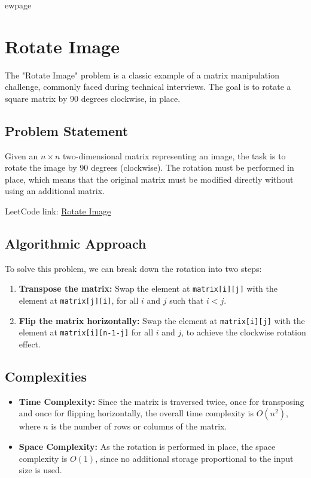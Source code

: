 
ewpage

\chapter{Rotate Image}
\label{chap:Rotate_Image}
The "Rotate Image" problem is a classic example of a matrix manipulation challenge, commonly faced during technical interviews. The goal is to rotate a square matrix by 90 degrees clockwise, in place.

\section*{Problem Statement}
Given an \( n \times n \) two-dimensional matrix representing an image, the task is to rotate the image by 90 degrees (clockwise). The rotation must be performed in place, which means that the original matrix must be modified directly without using an additional matrix.

LeetCode link: \href{https://leetcode.com/problems/rotate-image/}{Rotate Image}

\section*{Algorithmic Approach}
To solve this problem, we can break down the rotation into two steps:
\begin{enumerate}
    \item \textbf{Transpose the matrix:} Swap the element at \texttt{matrix[i][j]} with the element at \texttt{matrix[j][i]}, for all \(i\) and \(j\) such that \(i < j\).
    \item \textbf{Flip the matrix horizontally:} Swap the element at \texttt{matrix[i][j]} with the element at \texttt{matrix[i][n-1-j]} for all \(i\) and \(j\), to achieve the clockwise rotation effect.
\end{enumerate}


\section*{Complexities}
\begin{itemize}
	\item \textbf{Time Complexity:} Since the matrix is traversed twice, once for transposing and once for flipping horizontally, the overall time complexity is \( O(n^2) \), where \( n \) is the number of rows or columns of the matrix.
	\item \textbf{Space Complexity:} As the rotation is performed in place, the space complexity is \( O(1) \), since no additional storage proportional to the input size is used.
\end{itemize}


